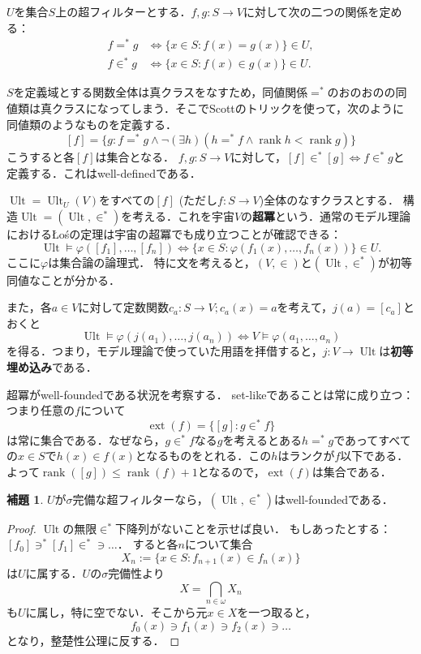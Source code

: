\documentclass[uplatex]{jsarticle}
\newcommand{\rank}{\operatorname{rank}}
\newcommand{\Ult}{\operatorname{Ult}}
\newcommand{\ext}{\operatorname{ext}}
\theoremstyle{definition}
\newtheorem{lem}[thm]{補題}
\begin{document}
	$U$を集合$S$上の超フィルターとする．$f, g \colon S \to V$に対して次の二つの関係を定める：
	\begin{align*}
		f =^* g &\iff \{ x \in S : f(x) = g(x) \} \in U, \\
		f \in^* g &\iff \{ x \in S : f(x) \in g(x) \} \in U.
	\end{align*}

	$S$を定義域とする関数全体は真クラスをなすため，同値関係$=^*$のおのおのの同値類は真クラスになってしまう．そこでScottのトリックを使って，次のように同値類のようなものを定義する．
	\[
	[f] = 	\{ g : f =^* g \land \neg (\exists h)(h =^* f \land \rank h < \rank g) \}
	\]
	こうすると各$[f]$は集合となる．
	$f, g \colon S \to V$に対して，$[f] \in^* [g] \iff f \in^* g$と定義する．これはwell-definedである．
	
	$\Ult = \Ult_U(V)$をすべての$[f]$ (ただし$f \colon S \to V$)全体のなすクラスとする．
	構造$\Ult = (\Ult, \in^*)$を考える．これを宇宙$V$の\textbf{超冪}という．通常のモデル理論におけるŁośの定理は宇宙の超冪でも成り立つことが確認できる：
	\[
	\Ult \models \varphi([f_1], \dots, [f_n]) \iff \{ x \in S : \varphi(f_1(x), \dots, f_n(x)) \} \in U.
	\]
	ここに$\varphi$は集合論の論理式．
	特に文を考えると，$(V, \in)$と$(\Ult, \in^*)$が初等同値なことが分かる．
	
	また，各$a \in V$に対して定数関数$c_a \colon S \to V; c_a(x) = a$を考えて，$j(a) = [c_a]$とおくと
	\[
	\Ult \models \varphi(j(a_1), \dots, j(a_n)) \iff V \models \varphi(a_1, \dots, a_n) 
	\]
	を得る．つまり，モデル理論で使っていた用語を拝借すると，$j \colon V \to \Ult$は\textbf{初等埋め込み}である．

	超冪がwell-foundedである状況を考察する．
	set-likeであることは常に成り立つ：つまり任意の$f$について
	\[
	\ext(f) = \{ [g] : g \in^* f \}
	\]
	は常に集合である．なぜなら，$g \in^* f$なる$g$を考えるとある$h =^* g$であってすべての$x \in S$で$h(x) \in f(x)$となるものをとれる．この$h$はランクが$f$以下である．よって$\rank([g]) \le \rank(f) + 1$となるので，$\ext(f)$は集合である．
	
	\begin{lem}
		$U$が$\sigma$完備な超フィルターなら，$(\Ult, \in^*)$はwell-foundedである．	
	\end{lem}
	\begin{proof}
		$\Ult$の無限$\in^*$下降列がないことを示せば良い．
		もしあったとする：$[f_0] \ni^* [f_1] \in^* \ni \dots$．
		すると各$n$について集合
		\[
			X_n := \{ x \in S : f_{n+1}(x) \in f_n(x) \}
		\]
		は$U$に属する．$U$の$\sigma$完備性より
		\[
			X = \bigcap_{n \in \omega} X_n
		\]
		も$U$に属し，特に空でない．そこから元$x \in X$を一つ取ると，
		\[
		f_0(x) \ni f_1(x) \ni f_2(x) \ni \dots
		\]
		となり，整楚性公理に反する．
	\end{proof}
	
\end{document}
